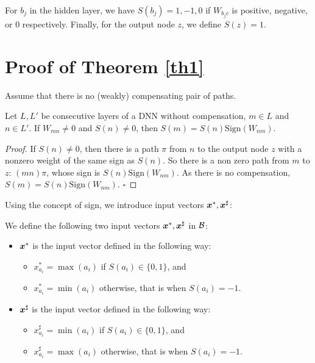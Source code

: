 For $b_j$ in the hidden layer, we have $S(b_j)=1,-1,0$ if $W_{b_j c}$ is positive, negative, or 0 respectively. Finally, for the output node $z$, we define $S(z)=1$.





\section{Proof of Theorem \ref{th1}}	


Assume that there is no (weakly) compensating pair of paths.


\begin{lemma}
	\label{lemma1}
	Let $L,L'$ be consecutive layers of a DNN without compensation, 
	$m\in L$ and $n\in L'$. If $W_{m n} \neq 0$ and $S(n) \neq 0$, then 
	$S(m)=S(n)\mathrm{Sign}(W_{n m})$.
\end{lemma}

\begin{proof}
	If $S(n) \neq 0$, then there is a path $\pi$ from $n$ to the output node $z$ with a nonzero weight of the same sign as $S(n)$. 
	So there is a non zero path from $m$ to $z$: $(m n) \pi$, whose sign is 
	$S(n)\mathrm{Sign}(W_{n m})$. As there is no compensation, $S(m)=S(n)\mathrm{Sign}(W_{n m})$.
	\hfill $\square$
\end{proof}



Using the concept of sign, we introduce input vectors $\boldsymbol{x}^{*}, \boldsymbol{x}^{\sharp}$: 

\begin{definition}
We define the following two input vectors $\boldsymbol{x}^{*}, \boldsymbol{x}^{\sharp}$ in $\cal B$: 
	\begin{itemize}
		\item $\boldsymbol{x}^{*}$ is the input vector defined in the following way:
		\begin {itemize}
		 \item $x^*_{a_i}=\max(a_i)$ if $S(a_i)\in \{0,1\}$, and
          \item $x^*_{a_i}=\min(a_i)$ otherwise, that is when $S(a_i)=-1$.
	\end{itemize}
		
		\item $\boldsymbol{x}^{\sharp}$ is the input vector defined in the following way:
		\begin{itemize}
			\item $x^{\sharp}_{a_i}=\min(a_i)$ if $S(a_i)\in \{0,1\}$, and
			\item $x^{\sharp}_{a_i}=\max(a_i)$ otherwise, that is when $S(a_i)=-1$.
		\end{itemize}
	\end{itemize}
\end{definition}


